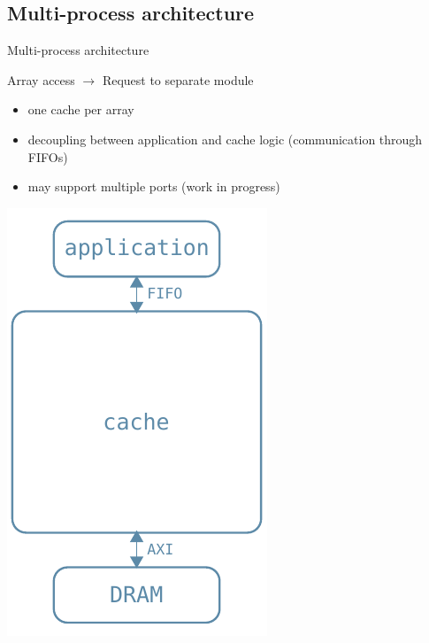 \documentclass[handout]{beamer}
\begin{document}
\subsection{Multi-process architecture}
\begin{frame}{Multi-process architecture}
	\begin{minipage}{.7\textwidth}
		\begin{center}
			Array access $\rightarrow$ Request to separate module
		\end{center}
		\begin{itemize}
			\item one cache per array
			\item decoupling between application and cache logic
				(communication through FIFOs)
			\item may support multiple ports (work in progress)
		\end{itemize}
	\end{minipage}
	\begin{minipage}{.28\textwidth}
		\begin{center}
			\includegraphics[width=.9\textwidth]{complete_arch.pdf}
		\end{center}
	\end{minipage}
\end{frame}
\end{document}
